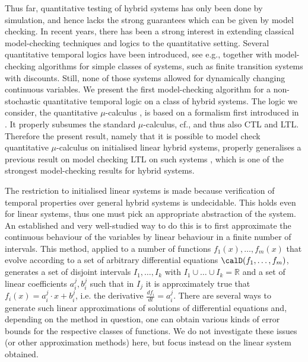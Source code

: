 \documentclass[fleqn,envcountsame]{LMCS}
\newcommand{\cf}{cf.\xspace}
\newcommand{\eg}{e.g.\xspace}
\newcommand{\ie}{i.e.\xspace}
\newcommand{\setR}{\ensuremath{\mathbb{R}}}
\begin{document}
Thus far, quantitative testing of hybrid systems has only been done
by simulation, and hence lacks the strong guarantees which can be given
by model checking. In recent years, there has been a strong interest
in extending classical model-checking techniques and logics to the quantitative
setting. Several quantitative temporal logics have been introduced,
see \eg  \cite{Alfaro03,AlfaroFS04,AlfaroM04,FGK10,seidl07,Hugo07,McIver},
together with model-checking algorithms for simple classes of systems,
such as finite transition systems with discounts. Still, none of those
systems allowed for dynamically changing continuous variables.
We present the first model-checking algorithm for a non-stochastic quantitative
temporal logic on a class of hybrid systems.
The logic we consider, the quantitative $\mu$-calculus \cite{FGK10},
is based on a formalism first introduced in \cite{AlfaroFS04}.
It properly subsumes the standard $\mu$-calculus, \cf \cite{BradfieldS01}, and
thus also CTL and LTL.
Therefore the present result, namely that it is possible to
model check quantitative $\mu$-calculus on initialised linear
hybrid systems, properly generalises a previous result on
model checking LTL on such systems \cite{HHM99,HKPV95}, which is
one of the strongest model-checking results for hybrid systems.

The restriction to initialised linear systems is made because verification
of temporal properties over general hybrid systems is undecidable. This
holds even for linear systems, thus one must pick an appropriate abstraction
of the system. An established and very well-studied way to do this is to
first approximate the continuous behaviour of the variables by linear
behaviour in a finite number of intervals.
This method, applied to a number of functions $f_1(x), \ldots, f_m(x)$ that
evolve according to a set of arbitrary differential equations
$\calD(f_1, \ldots, f_m)$, generates a set of disjoint intervals
$I_1, \ldots, I_k$ with $I_1 \cup \ldots \cup I_k = \setR$ and
a set of linear coefficients $a_i^j, b_i^j$ such that in $I_j$ it is
approximately true that $f_i(x) = a_i^j \cdot x + b_i^j$, \ie the
derivative $\frac {df_i}{dt} = a_i^j$. There are several
ways to generate such linear approximations of solutions of differential
equations and, depending on the method in question, one can obtain various
kinds of error bounds for the respective classes of functions.
We do not investigate these issues (or other approximation methods) here,
but focus instead on the linear system obtained. 
\end{document}

